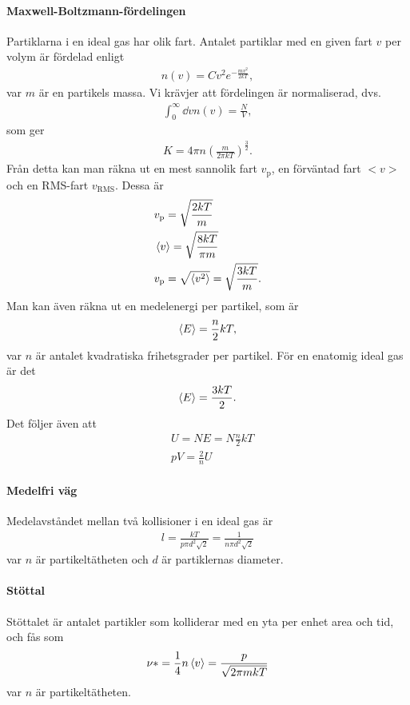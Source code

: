 \paragraph{Maxwell-Boltzmann-fördelingen}
Partiklarna i en ideal gas har olik fart. Antalet partiklar med en given fart $v$ per volym är fördelad enligt
\begin{align*}
	n(v) = Cv^2e^{-\frac{mv^2}{2kT}},
\end{align*}
var $m$ är en partikels massa. Vi krävjer att fördelingen är normaliserad, dvs.
\begin{align*}
	\int_0^{\infty}\dd{v}n(v) = \frac{N}{V},
\end{align*}
som ger
\begin{align*}
	K = 4\pi n \left(\frac{m}{2\pi kT}\right)^\frac{3}{2}.
\end{align*}
Från detta kan man räkna ut en mest sannolik fart $v_\text{p}$, en förväntad fart $<v>$ och en RMS-fart $v_\text{RMS}$. Dessa är
\begin{align*}
	& v_\text{p} = \sqrt{\frac{2kT}{m}}\\
	& \expval{v} = \sqrt{\frac{8kT}{\pi m}}\\
	& v_\text{p} = \sqrt{\expval{v^2}} = \sqrt{\frac{3kT}{m}}.
\end{align*}
Man kan även räkna ut en medelenergi per partikel, som är
\begin{align*}
	\expval{E} = \frac{n}{2}kT,
\end{align*}
var $n$ är antalet kvadratiska frihetsgrader per partikel. För en enatomig ideal gas är det
\begin{align*}
	\expval{E} = \frac{3kT}{2}.
\end{align*}
Det följer även att
\begin{align*}
	& U = NE = N\frac{n}{2}kT\\
	& pV = \frac{2}{n}U
\end{align*}

\paragraph{Medelfri väg}
Medelavståndet mellan två kollisioner i en ideal gas är
\begin{align*}
	l = \frac{kT}{p\pi d^2\sqrt{2}} = \frac{1}{n\pi d^2\sqrt{2}}
\end{align*}
var $n$ är partikeltätheten och $d$ är partiklernas diameter.

\paragraph{Stöttal}
Stöttalet är antalet partikler som kolliderar med en yta per enhet area och tid, och fås som
\begin{align*}
	\nu * = \frac{1}{4}n\expval{v} = \frac{p}{\sqrt{2\pi mkT}}
\end{align*}
var $n$ är partikeltätheten.

